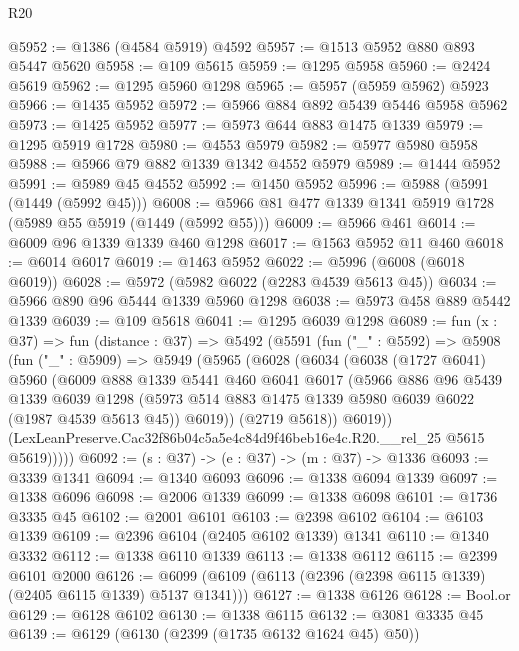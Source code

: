 \begin{lexlean}{R20}
\begin{coremodule}
@5952 := @1386 (@4584 @5919) @4592
@5957 := @1513 @5952 @880 @893 @5447 @5620
@5958 := @109 @5615
@5959 := @1295 @5958
@5960 := @2424 @5619
@5962 := @1295 @5960 @1298
@5965 := @5957 (@5959 @5962) @5923
@5966 := @1435 @5952
@5972 := @5966 @884 @892 @5439 @5446 @5958 @5962
@5973 := @1425 @5952
@5977 := @5973 @644 @883 @1475 @1339
@5979 := @1295 @5919 @1728
@5980 := @4553 @5979
@5982 := @5977 @5980 @5958
@5988 := @5966 @79 @882 @1339 @1342 @4552 @5979
@5989 := @1444 @5952
@5991 := @5989 @45 @4552
@5992 := @1450 @5952
@5996 := @5988 (@5991 (@1449 (@5992 @45)))
@6008 := @5966 @81 @477 @1339 @1341 @5919 @1728 (@5989 @55 @5919 (@1449 (@5992 @55)))
@6009 := @5966 @461
@6014 := @6009 @96 @1339 @1339 @460 @1298
@6017 := @1563 @5952 @11 @460
@6018 := @6014 @6017
@6019 := @1463 @5952
@6022 := @5996 (@6008 (@6018 @6019))
@6028 := @5972 (@5982 @6022 (@2283 @4539 @5613 @45))
@6034 := @5966 @890 @96 @5444 @1339 @5960 @1298
@6038 := @5973 @458 @889 @5442 @1339
@6039 := @109 @5618
@6041 := @1295 @6039 @1298
@6089 := fun (x : @37) =>
  fun (distance : @37) =>
  @5492
    (@5591
      (fun ("_" : @5592) =>
      @5908
        (fun ("_" : @5909) =>
        @5949
          (@5965
            (@6028
              (@6034
                (@6038
                  (@1727 @6041)
                  @5960
                  (@6009
                    @888
                    @1339
                    @5441
                    @460
                    @6041
                    @6017
                    (@5966
                      @886
                      @96
                      @5439
                      @1339
                      @6039
                      @1298
                      (@5973 @514 @883 @1475 @1339 @5980 @6039 @6022 (@1987 @4539 @5613 @45))
                      @6019))
                  (@2719 @5618))
                @6019))
            (LexLeanPreserve.Cac32f86b04c5a5e4c84d9f46beb16e4c.R20.__rel_25 @5615 @5619)))))
@6092 := (s : @37) -> (e : @37) -> (m : @37) -> @1336
@6093 := @3339 @1341
@6094 := @1340 @6093
@6096 := @1338 @6094 @1339
@6097 := @1338 @6096
@6098 := @2006 @1339
@6099 := @1338 @6098
@6101 := @1736 @3335 @45
@6102 := @2001 @6101
@6103 := @2398 @6102
@6104 := @6103 @1339
@6109 := @2396 @6104 (@2405 @6102 @1339) @1341
@6110 := @1340 @3332
@6112 := @1338 @6110 @1339
@6113 := @1338 @6112
@6115 := @2399 @6101 @2000
@6126 := @6099 (@6109 (@6113 (@2396 (@2398 @6115 @1339) (@2405 @6115 @1339) @5137 @1341)))
@6127 := @1338 @6126
@6128 := Bool.or
@6129 := @6128 @6102
@6130 := @1338 @6115
@6132 := @3081 @3335 @45
@6139 := @6129 (@6130 (@2399 (@1735 @6132 @1624 @45) @50))

\end{coremodule}
\end{lexlean}
